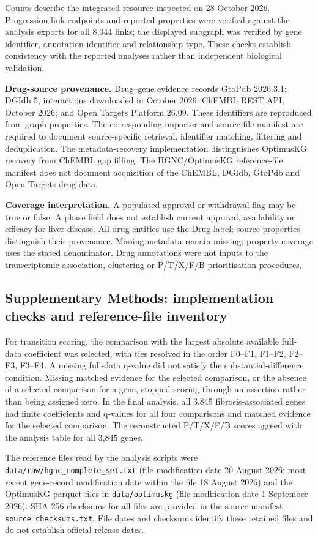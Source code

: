 \documentclass[11pt,a4paper]{article}
\begin{document}
\small
Counts describe the integrated resource inspected on 28 October 2026. Progression-link endpoints and reported properties were verified against the analysis exports for all 8,044 links; the displayed subgraph was verified by gene identifier, annotation identifier and relationship type. These checks establish consistency with the reported analyses rather than independent biological validation.

\textbf{Drug-source provenance.} Drug--gene evidence records GtoPdb 2026.3.1; DGIdb 5, interactions downloaded in October 2026; ChEMBL REST API, October 2026; and Open Targets Platform 26.09. These identifiers are reproduced from graph properties. The corresponding importer and source-file manifest are required to document source-specific retrieval, identifier matching, filtering and deduplication. The metadata-recovery implementation distinguishes OptimusKG recovery from ChEMBL gap filling. The HGNC/OptimusKG reference-file manifest does not document acquisition of the ChEMBL, DGIdb, GtoPdb and Open Targets drug data.

\textbf{Coverage interpretation.} A populated approval or withdrawal flag may be true or false. A phase field does not establish current approval, availability or efficacy for liver disease. All drug entities use the Drug label; source properties distinguish their provenance. Missing metadata remain missing; property coverage uses the stated denominator. Drug annotations were not inputs to the transcriptomic association, clustering or P/T/X/F/B prioritisation procedures.
\endgroup

\subsection*{Supplementary Methods: implementation checks and reference-file inventory}
For transition scoring, the comparison with the largest absolute available full-data coefficient was selected, with ties resolved in the order F0--F1, F1--F2, F2--F3, F3--F4. A missing full-data q-value did not satisfy the substantial-difference condition. Missing matched evidence for the selected comparison, or the absence of a selected comparison for a gene, stopped scoring through an assertion rather than being assigned zero. In the final analysis, all 3,845 fibrosis-associated genes had finite coefficients and q-values for all four comparisons and matched evidence for the selected comparison. The reconstructed P/T/X/F/B scores agreed with the analysis table for all 3,845 genes.

The reference files read by the analysis scripts were \nolinkurl{data/raw/hgnc_complete_set.txt} (file modification date 20 August 2026; most recent gene-record modification date within the file 18 August 2026) and the OptimusKG parquet files in \nolinkurl{data/optimuskg} (file modification date 1 September 2026). SHA-256 checksums for all files are provided in the source manifest, \nolinkurl{source_checksums.txt}. File dates and checksums identify these retained files and do not establish official release dates.
\end{document}

